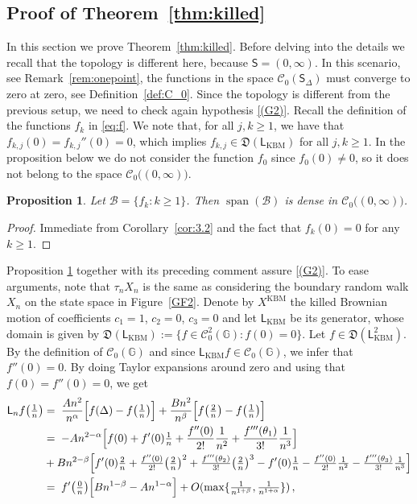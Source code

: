 \documentclass[12pt,a4paper]{article}
\theoremstyle{plain}
\newtheorem{proposition}[theorem]{Proposition}
\theoremstyle{remark}
\DeclareMathOperator{\spann}{span}
\newcommand{\msf}[1]{{\mathsf #1}}
\newcommand{\mc}[1]{{\mathcal #1}}
\newcommand{\mf}[1]{{\mathfrak #1}}
\newcommand{\bb}[1]{{\mathbb #1}}
\newcommand{\pfrac}[2]{\genfrac{}{}{}{1}{#1}{#2}}
\newcommand{\pn}[1]{\big(\pfrac{#1}{n}\big)}
\begin{document}
	
	\subsection{Proof of Theorem~\ref{thm:killed}}\label{subsec:killed} In this section we prove Theorem~\ref{thm:killed}. Before delving into the details we recall that the topology is different here, because $\msf{S} = (0,\infty)$. In this scenario, see Remark~\ref{rem:onepoint}, the functions in the space $\mc{C}_0(\msf S_\Delta)$ must converge to zero at zero, see  Definition~\ref{def:C_0}.
	Since the topology is different from the previous setup, we need to check again hypothesis \ref{(G2)}. Recall the definition of the functions $f_k$ in \eqref{eq:f}. We note that, for all $j,k\geq 1$, we have that $f_{k,j}(0)= f_{k,j}''(0)=0$, which implies $f_{k,j}\in \mf D(\msf{L}_{\text{KBM}})$ for all $j,k\geq 1$. In the proposition below we do not consider the function $f_0$ since $f_0(0)\neq 0$, so it does not belong to the
	space $\mc{C}_0\big((0,\infty)\big)$. 
	\begin{proposition}\label{prop:killeddom}
		Let $\mc{B} = \{f_k: k \geq 1\}$. Then $\spann(\mc{B})$ is  dense in $\mc{C}_0\big((0,\infty)\big)$.
	\end{proposition}
	\begin{proof}
		Immediate from Corollary~\ref{cor:3.2} and the fact that $f_k(0)=0$ for any  $k\geq 1$.
	\end{proof}
	Proposition \ref{prop:killeddom} together with its preceding comment assure \ref{(G2)}. To ease arguments, note  that $\tau_n X_n$ is the same as considering the boundary random walk $X_n$  on the state space in Figure~\ref{GF2}.
	Denote by $X^{\text{KBM}}$  the killed Brownian motion of coefficients $c_1=1$, $c_2=0$, $c_3=0$ and  let  $\msf{L}_\text{KBM}$ be its generator, whose domain  is given by
	$\mf{D}\left(\msf{L}_\text{KBM}\right) := \{f \in \mc{C}_0^2(\bb{G}):f(0) = 0\}$.
	Let $f\in \mf{D}(\msf{L}_\text{KBM}^2)$. By the definition of $\mc{C}_0(\bb{G})$ and since $\msf{L}_\text{KBM}f\in \mc{C}_0(\bb{G})$, we infer that  $f''(0)= 0$.
	By doing Taylor expansions around zero and using that $f(0)=f''(0)=0$, we get
	\begin{align}
		\msf{L}_nf\pn{1}
		&=\;  \frac{An^2}{n^\alpha}\Big[f(\Delta) - f\pn{1}\Big] +\frac{Bn^2}{n^\beta}\Big[ f\pn{2} - f\pn{1}\Big] \notag \\
		&=\; -An^{2-\alpha}\Big[f(0)+f'(0)\pfrac{1}{n} +\frac{f''(0)}{2!}\frac{1}{n^2}+\frac{f'''(\theta_1)}{3!} \frac{1}{n^3}\Big] \notag \\
		&+ Bn^{2-\beta}\Big[ f'(0)\pfrac{2}{n}+\pfrac{f''(0)}{2!}\big(\pfrac{2}{n}\big)^2 +\pfrac{f'''(\theta_2)}{3!}\big(\pfrac{2}{n}\big)^3- f'(0)\pfrac{1}{n}-\pfrac{f''(0)}{2!}\pfrac{1}{n^2} -\pfrac{f'''(\theta_3)}{3!}\pfrac{1}{n^3}\Big] \notag\\
		& = \; f'\pn{0}\Big[Bn^{1-\beta}-An^{1-\alpha}\Big] + O(\max\{\pfrac{1}{n^{1+\beta}},\pfrac{1}{n^{1+\alpha}}\})\,,\label{nonvanishing}
	\end{align}
\end{document}
